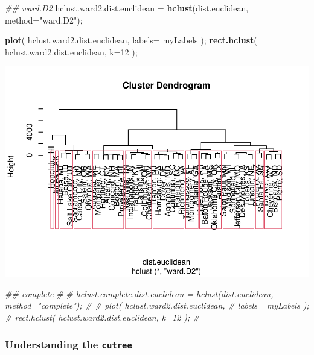 \documentclass[
]{article}
\newenvironment{Shaded}{\begin{snugshade}}{\end{snugshade}}
\newcommand{\CommentTok}[1]{\textcolor[rgb]{0.56,0.35,0.01}{\textit{#1}}}
\newcommand{\DataTypeTok}[1]{\textcolor[rgb]{0.13,0.29,0.53}{#1}}
\newcommand{\DecValTok}[1]{\textcolor[rgb]{0.00,0.00,0.81}{#1}}
\newcommand{\KeywordTok}[1]{\textcolor[rgb]{0.13,0.29,0.53}{\textbf{#1}}}
\newcommand{\NormalTok}[1]{#1}
\newcommand{\StringTok}[1]{\textcolor[rgb]{0.31,0.60,0.02}{#1}}
\begin{document}
\begin{Shaded}
\begin{Highlighting}[]
\CommentTok{\#\# ward.D2}
\NormalTok{hclust.ward2.dist.euclidean =}\StringTok{ }\KeywordTok{hclust}\NormalTok{(dist.euclidean, }\DataTypeTok{method=}\StringTok{"ward.D2"}\NormalTok{);}

\KeywordTok{plot}\NormalTok{( hclust.ward2.dist.euclidean, }
      \DataTypeTok{labels=}\NormalTok{ myLabels );}
\KeywordTok{rect.hclust}\NormalTok{( hclust.ward2.dist.euclidean, }\DataTypeTok{k=}\DecValTok{12}\NormalTok{ );}
\end{Highlighting}
\end{Shaded}

\includegraphics{graphics/chunk-distances-hclust-euclidean-1.pdf}

\begin{Shaded}
\begin{Highlighting}[]
\CommentTok{\#\# complete}
\CommentTok{\# }
\CommentTok{\# hclust.complete.dist.euclidean = hclust(dist.euclidean, method="complete");}
\CommentTok{\# }
\CommentTok{\# plot( hclust.ward2.dist.euclidean, }
\CommentTok{\#       labels= myLabels );}
\CommentTok{\# rect.hclust( hclust.ward2.dist.euclidean, k=12 );}
\CommentTok{\#   }
\end{Highlighting}
\end{Shaded}

\hypertarget{understanding-the-cutree}{%
\subsubsection{\texorpdfstring{Understanding the
\texttt{cutree}}{Understanding the cutree}}\label{understanding-the-cutree}}
\end{document}
